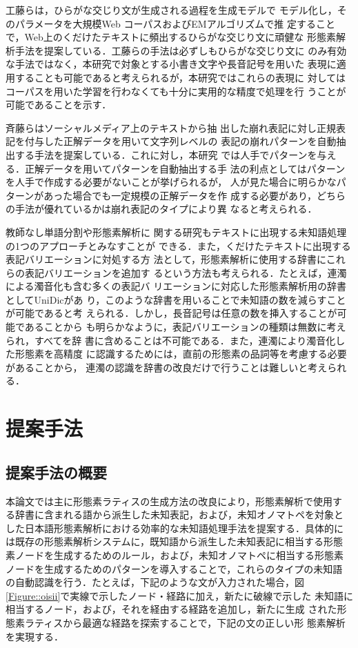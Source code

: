 \documentclass[japanese]{jnlp_1.4}
\begin{document}
  工藤ら\citeyear{Kudo2012}は，ひらがな交じり文が生成される過程を生成モデルで
  モデル化し，そのパラメータを大規模Web コーパスおよびEMアルゴリズムで推
  定することで，Web上のくだけたテキストに頻出するひらがな交じり文に頑健な
  形態素解析手法を提案している．工藤らの手法は必ずしもひらがな交じり文に
  のみ有効な手法ではなく，本研究で対象とする小書き文字や長音記号を用いた
  表現に適用することも可能であると考えられるが，本研究ではこれらの表現に
  対してはコーパスを用いた学習を行わなくても十分に実用的な精度で処理を行
  うことが可能であることを示す．

  斉藤ら\citeyear{Saito2013,Saito2014}はソーシャルメディア上のテキストから抽
  出した崩れ表記に対し正規表記を付与した正解データを用いて文字列レベルの
  表記の崩れパターンを自動抽出する手法を提案している．これに対し，本研究
  では人手でパターンを与える．正解データを用いてパターンを自動抽出する手
  法の利点としてはパターンを人手で作成する必要がないことが挙げられるが，
  人が見た場合に明らかなパターンがあった場合でも一定規模の正解データを作
  成する必要があり，どちらの手法が優れているかは崩れ表記のタイプにより異
  なると考えられる．

  教師なし単語分割\cite{Goldwater2006}や形態素解析\cite{Mochihashi2009}に
  関する研究もテキストに出現する未知語処理の1つのアプローチとみなすことが
  できる．また，くだけたテキストに出現する表記バリエーションに対処する方
  法として，形態素解析に使用する辞書にこれらの表記バリエーションを追加す
  るという方法も考えられる．たとえば，連濁による濁音化も含む多くの表記バ
  リエーションに対応した形態素解析用の辞書としてUniDic\cite{Den2007}があ
  り，このような辞書を用いることで未知語の数を減らすことが可能であると考
  えられる．しかし，長音記号は任意の数を挿入することが可能であることから
  も明らかなように，表記バリエーションの種類は無数に考えられ，すべてを辞
  書に含めることは不可能である．また，連濁により濁音化した形態素を高精度
  に認識するためには，直前の形態素の品詞等を考慮する必要があることから，
  連濁の認識を辞書の改良だけで行うことは難しいと考えられる．
 

 \section{提案手法}
 \label{SEC::PRO}

  \subsection{提案手法の概要}

  本論文では主に形態素ラティスの生成方法の改良により，形態素解析で使用す
  る辞書に含まれる語から派生した未知表記，および，未知オノマトペを対象と
  した日本語形態素解析における効率的な未知語処理手法を提案する．具体的に
  は既存の形態素解析システムに，既知語から派生した未知表記に相当する形態
  素ノードを生成するためのルール，および，未知オノマトペに相当する形態素
  ノードを生成するためのパターンを導入することで，これらのタイプの未知語
  の自動認識を行う．たとえば，下記のような文が入力された場合，図
  \ref{Figure::oisii}で実線で示したノード・経路に加え，新たに破線で示した
  未知語に相当するノード，および，それを経由する経路を追加し，新たに生成
  された形態素ラティスから最適な経路を探索することで，下記の文の正しい形
  態素解析を実現する．
\end{document}
